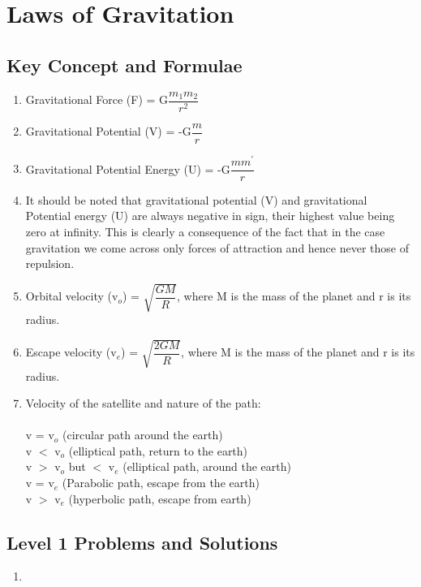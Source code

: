 \chapter{Laws of Gravitation}

\pagestyle{fancy}
\fancyhf{}
\fancyhead[OC]{\leftmark}
\fancyhead[EC]{\rightmark}
\cfoot{\thepage}

\section{Key Concept and Formulae}

\begin{enumerate}
    \item Gravitational Force (F) = G$\dfrac{m_1m_2}{r^2}$ 
    
    \item Gravitational Potential (V) = -G$\dfrac{m}{r}$
    
    \item Gravitational Potential Energy (U) = -G$\dfrac{mm^{'}}{r}$
    
    \item It should be noted that gravitational potential (V) and gravitational Potential energy (U) are always negative in sign, their highest value being zero at infinity. This is clearly a consequence of the fact that in the case gravitation we come across only forces of attraction and hence never those of repulsion. 
    
    \item Orbital velocity (v$_o$) = $\sqrt{\dfrac{GM}{R}}$, where M is the mass of the planet and r is its radius.
    
    \item Escape velocity (v$_e$) = $\sqrt{\dfrac{2GM}{R}}$, where M is the mass of the planet and r is its radius.
    
    \item Velocity of the satellite and nature of the path: \\\\
    v = v$_o$ (circular path around the earth)\\
    v $<$ v$_o$ (elliptical path, return to the earth)\\
    v $>$ v$_o$ but $<$ v$_e$ (elliptical path, around the earth)\\
    v = v$_e$ (Parabolic path, escape from the earth)\\
    v $>$ v$_e$ (hyperbolic path, escape from earth)\\
    

    
\end{enumerate}
\section{Level 1 Problems and Solutions}
\begin{enumerate}
    \item 
\end{enumerate}